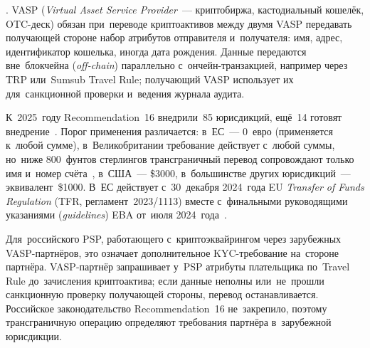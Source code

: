 . VASP (\textit{Virtual Asset Service
Provider}~--- криптобиржа, кастодиальный кошелёк, OTC-деск) обязан при~переводе
криптоактивов между двумя VASP передавать получающей стороне набор атрибутов
отправителя и~получателя: имя, адрес, идентификатор кошелька, иногда дата
рождения. Данные передаются вне~блокчейна (\textit{off-chain}) параллельно
с~ончейн-транзакцией, например через TRP или~Sumsub Travel Rule; получающий
VASP использует их для~санкционной проверки и~ведения журнала аудита.

К~2025~году Recommendation~16 внедрили~85 юрисдикций, ещё~14 готовят
внедрение~\cite{fatf-targeted-update-va-2025}. Порог применения различается:
в~ЕС~--- 0~евро (применяется к~любой сумме), в~Великобритании требование
действует с~любой суммы, но~ниже 800~фунтов стерлингов трансграничный перевод сопровождают
только имя и~номер счёта~\cite{uk-mlr-2017-64c}, в~США~--- \$3000,
в~большинстве других юрисдикций~--- эквивалент~\$1000. В~ЕС действует
с~30~декабря 2024~года EU \textit{Transfer of Funds Regulation} (TFR,
регламент~2023/1113) вместе с~финальными руководящими указаниями
(\textit{guidelines}) EBA от~июля 2024~года~\cite{eba-travel-rule-2024}.

Для~российского PSP, работающего с~криптоэквайрингом через зарубежных
VASP-партнёров, это означает дополнительное KYC-требование на~стороне партнёра.
VASP-партнёр запрашивает у~PSP атрибуты плательщика по~Travel Rule
до~зачисления криптоактива; если данные неполны или~не~прошли санкционную
проверку получающей стороны, перевод останавливается. Российское
законодательство Recommendation~16 не~закрепило, поэтому трансграничную операцию
определяют требования партнёра в~зарубежной юрисдикции.
